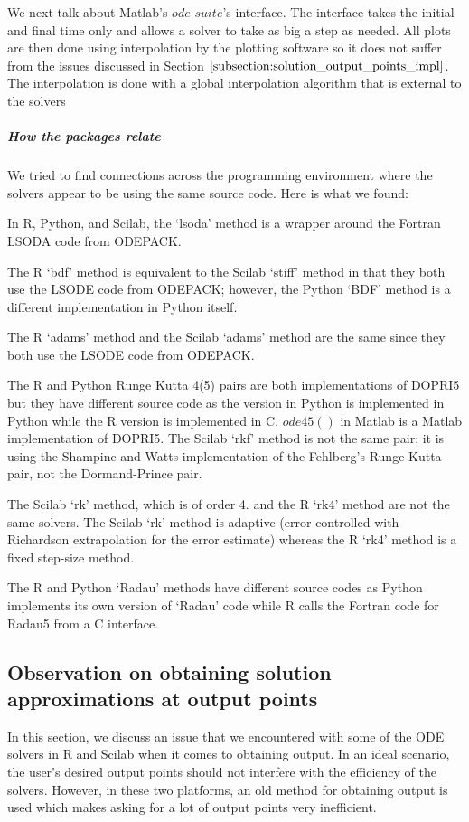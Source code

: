 We next talk about Matlab's $ode$ $suite$'s interface. The interface takes the initial and final time only and allows a solver to take as big a step as needed. All plots are then done using interpolation by the plotting software so it does not suffer from the issues discussed in Section $\ref{subsection:solution_output_points_impl}$. The interpolation is done with a global interpolation algorithm that is external to the solvers

\subparagraph{How the packages relate}
We tried to find connections across the programming environment where the solvers appear to be using the same source code.
Here is what we found:

In R, Python, and Scilab, the `lsoda' method is a wrapper around the Fortran LSODA code from ODEPACK.

The R `bdf' method is equivalent to the Scilab `stiff' method in that they both use the LSODE code from ODEPACK; however, the Python `BDF' method is a different implementation in Python itself.

The R `adams' method and the Scilab `adams' method are the same since they both use the LSODE code from ODEPACK.

The R and Python Runge Kutta 4(5) pairs are both implementations of DOPRI5 but they have different source code as the version in Python is implemented in Python while the R version is implemented in C. $ode45()$ in Matlab is a Matlab implementation of DOPRI5. The Scilab `rkf' method is not the same pair; it is using the Shampine and Watts implementation of the Fehlberg's Runge-Kutta pair, not the Dormand-Prince pair. 

The Scilab `rk' method, which is of order 4. and the R `rk4' method are not the same solvers. The Scilab `rk' method is adaptive (error-controlled with Richardson extrapolation for the error estimate) whereas the R `rk4' method is a fixed step-size method.

The R and Python `Radau' methods have different source codes as Python implements its own version of `Radau' code while R calls the Fortran code for Radau5 from a C interface.

\subsection{Observation on obtaining solution approximations at output points}
\label{subsection:solution_output_points_impl}
In this section, we discuss an issue that we encountered with some of the ODE solvers in R and Scilab when it comes to obtaining output. In an ideal scenario, the user's desired output points should not interfere with the efficiency of the solvers. However, in these two platforms, an old method for obtaining output is used which makes asking for a lot of output points very inefficient.

